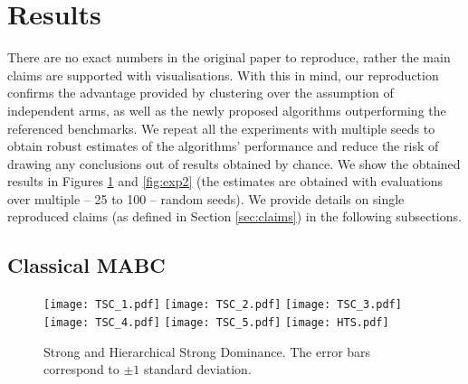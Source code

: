 \section{Results}
\label{sec:results}

There are no exact numbers in the original paper to reproduce, rather the main claims are supported with visualisations. With this in mind, our reproduction confirms the advantage provided by clustering over the assumption of independent arms, as well as the newly proposed algorithms outperforming the referenced benchmarks. We repeat all the experiments with multiple seeds to obtain robust estimates of the algorithms' performance and reduce the risk of drawing any conclusions out of results obtained by chance. We show the obtained results in Figures \ref{fig:exp1} and \ref{fig:exp2} (the estimates are obtained with evaluations over multiple -- 25 to 100 -- random seeds). We provide details on single reproduced claims (as defined in Section \ref{sec:claims}) in the following subsections.

\subsection{Classical MABC}

\begin{figure}[t]
    \texttt{[image: TSC\_1.pdf]}
    \label{fig:cluster1}
  \endminipage \hfill
    \texttt{[image: TSC\_2.pdf]}
    \label{fig:cluster2}
  \endminipage \hfill
    \texttt{[image: TSC\_3.pdf]}
    \label{fig:cluster3}
  \endminipage
  \vfill
    \texttt{[image: TSC\_4.pdf]}
    \label{fig:cluster4}
  \endminipage \hfill
    \texttt{[image: TSC\_5.pdf]}
    \label{fig:cluster5}
  \endminipage \hfill
    \texttt{[image: HTS.pdf]}
    \label{fig:hier}
  \endminipage
  \caption{Strong and Hierarchical Strong Dominance. The error bars correspond to $\pm 1$ standard deviation.}
  \label{fig:exp1}
\end{figure}

